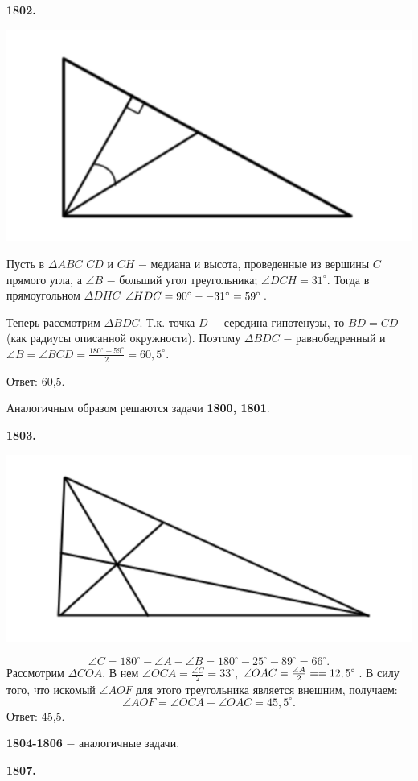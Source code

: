 \textbf{1802.}

{\centering \includegraphics[width=0.5\linewidth]{Geometry/Content/13.png}
	
}

Пусть в $\Delta ABC$ $CD$ и $CH$ $-$ медиана и высота, проведенные из вершины $C$ прямого угла, а $\angle B$ $-$ больший угол треугольника; $\angle DCH = 31^\circ$. Тогда в прямоугольном $\Delta DHC$ $\angle HDC = 90^\circ - \linebreak -31^\circ = 59^\circ$. 

Теперь рассмотрим $\Delta BDC$. Т.к. точка $D$ $-$ середина гипотенузы, то $BD = CD$ (как радиусы описанной окружности). Поэтому $\Delta BDC$ $-$ равнобедренный и $\angle B = \angle BCD = \frac{180^\circ - 59^\circ}{2} = 60,5^\circ$.

 \null \hspace*{\fill} Ответ: 60,5.

Аналогичным образом решаются задачи \textbf{1800, 1801}. 

\textbf{1803.}

{\centering \includegraphics[width=0.5\linewidth]{Geometry/Content/14.png}
	
}
\[
\angle C = 180^\circ - \angle A - \angle B = 180^\circ - 25^\circ - 89^\circ = 66^\circ.
\]
 Рассмотрим $\Delta COA$. В нем $\angle OCA = \frac{\angle C}{2} = 33^\circ$, $\angle OAC = \frac{\angle A}{2} = \linebreak = 12,5^\circ$. В силу того, что искомый $\angle AOF$ для этого треугольника является внешним, получаем:
\[
\angle AOF = \angle OCA + \angle OAC = 45,5^\circ.
\] \null \hspace*{\fill} Ответ: 45,5. 

\textbf{1804-1806} $-$ аналогичные задачи.

\textbf{1807.}

